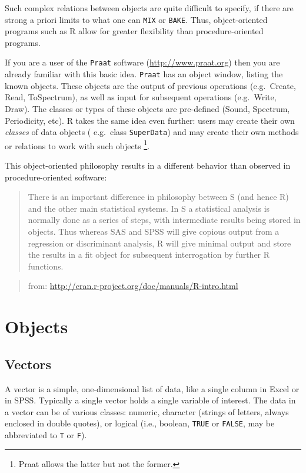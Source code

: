 \documentclass[]{book}
\begin{document}
Such complex relations between objects are quite difficult to specify,
if there are strong a priori limits to what one can \texttt{MIX} or \texttt{BAKE}.
Thus, object-oriented programs such as R allow for
greater flexibility than procedure-oriented programs.

If you are a user of the \texttt{Praat} software (\url{http://www.praat.org}) then you are already familiar with this basic idea.
\texttt{Praat} has an object window, listing the known objects.
These objects are the output of previous operations (e.g.~Create, Read,
ToSpectrum), as well as input for subsequent operations (e.g.~Write,
Draw). The classes or types of these objects are pre-defined (Sound,
Spectrum, Periodicity, etc). R takes the same idea even
further: users may create their own \emph{classes} of data objects (
e.g.~class \texttt{SuperData}) and may create their own methods or relations to work with
such objects \footnote{Praat allows the latter but not the former.}.

This object-oriented philosophy results in a different behavior than
observed in procedure-oriented software:

\begin{quote}
There is an important difference in philosophy between S (and hence R)
and the other main statistical systems. In S a statistical analysis is
normally done as a series of steps, with intermediate results being
stored in objects. Thus whereas SAS and SPSS will give copious output
from a regression or discriminant analysis, R will give minimal output
and store the results in a fit object for subsequent interrogation by
further R functions.
\end{quote}

\begin{quote}
from: \url{http://cran.r-project.org/doc/manuals/R-intro.html}
\end{quote}

\hypertarget{ch:objects}{%
\chapter{Objects}\label{ch:objects}}

\hypertarget{sec:vectors}{%
\section{Vectors}\label{sec:vectors}}

A vector is a simple, one-dimensional list of data, like a single column
in Excel or in SPSS. Typically a single vector holds a single variable
of interest. The data in a vector can be of various classes: numeric,
character (strings of letters, always enclosed in double quotes), or
logical (i.e., boolean, \texttt{TRUE} or
\texttt{FALSE}, may be abbreviated to
\texttt{T} or \texttt{F}).
\end{document}
